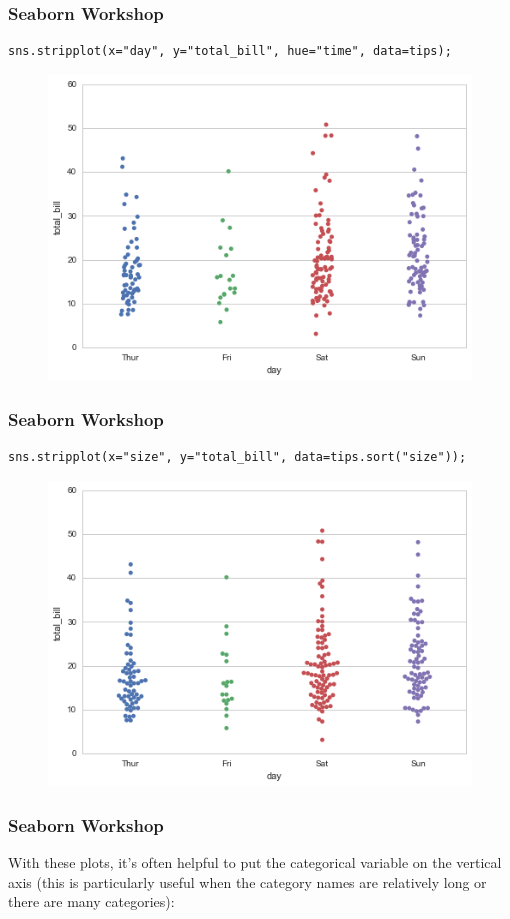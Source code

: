 \documentclass{beamer}
\begin{document}
\begin{frame}[fragile]
	\frametitle{Seaborn Workshop}
	\large
\begin{verbatim}
sns.stripplot(x="day", y="total_bill", hue="time", data=tips);
\end{verbatim}

\begin{figure}
\centering
\includegraphics[width=0.7\linewidth]{images/categorical_11_0}
\end{figure}
\end{frame}
\begin{frame}[fragile]
	\frametitle{Seaborn Workshop}
	\large
\begin{verbatim}
sns.stripplot(x="size", y="total_bill", data=tips.sort("size"));
\end{verbatim}

\begin{figure}
	\centering
	\includegraphics[width=0.7\linewidth]{images/categorical_13_0}
\end{figure}
\end{frame}
\begin{frame}[fragile]
\frametitle{Seaborn Workshop}
\large
With these plots, it’s often helpful to put the categorical variable on the vertical axis (this is particularly useful when the category names are relatively long or there are many categories):
\end{frame}
\end{document}
